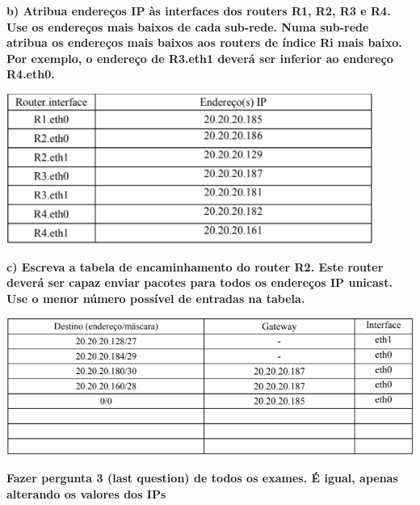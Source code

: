 \documentclass[../resumosRCOM.tex]{subfiles}
\begin{document}
\textbf{b) Atribua endereços IP às interfaces dos routers R1, R2, R3 e R4. Use os endereços mais baixos de cada sub-rede. Numa sub-rede atribua os endereços mais baixos aos routers de índice Ri mais baixo. Por exemplo, o endereço de R3.eth1 deverá ser inferior ao endereço R4.eth0.}
\begin{center}
    \includegraphics[width=12cm]{images/RCOM42.png}
\end{center}
\textbf{c) Escreva a tabela de encaminhamento do router R2. Este router deverá ser capaz enviar pacotes para todos os endereços IP unicast. Use o menor número possível de entradas na tabela.}
\begin{center}
    \includegraphics[width=14cm]{images/RCOM43.png}
\end{center}
\textbf{Fazer pergunta 3 (last question) de todos os exames. É igual, apenas alterando os valores dos IPs}
\end{document}
